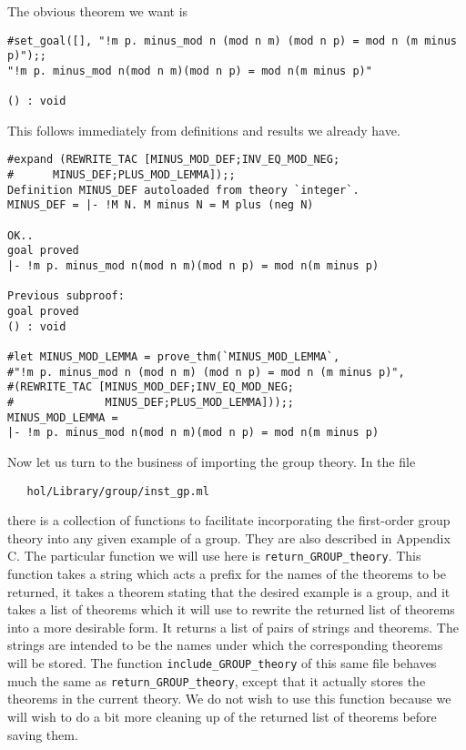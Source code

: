 The obvious theorem we want is
\begin{session}
\begin{verbatim}
#set_goal([], "!m p. minus_mod n (mod n m) (mod n p) = mod n (m minus p)");;
"!m p. minus_mod n(mod n m)(mod n p) = mod n(m minus p)"

() : void
\end{verbatim}
\end{session}
This follows immediately from definitions and results we already have.
\begin{session}
\begin{verbatim}
#expand (REWRITE_TAC [MINUS_MOD_DEF;INV_EQ_MOD_NEG;
#	   MINUS_DEF;PLUS_MOD_LEMMA]);;
Definition MINUS_DEF autoloaded from theory `integer`.
MINUS_DEF = |- !M N. M minus N = M plus (neg N)

OK..
goal proved
|- !m p. minus_mod n(mod n m)(mod n p) = mod n(m minus p)

Previous subproof:
goal proved
() : void

#let MINUS_MOD_LEMMA = prove_thm(`MINUS_MOD_LEMMA`,
#"!m p. minus_mod n (mod n m) (mod n p) = mod n (m minus p)",
#(REWRITE_TAC [MINUS_MOD_DEF;INV_EQ_MOD_NEG;
#              MINUS_DEF;PLUS_MOD_LEMMA]));;
MINUS_MOD_LEMMA = 
|- !m p. minus_mod n(mod n m)(mod n p) = mod n(m minus p)
\end{verbatim}
\end{session}

Now let us turn to the business of importing the group theory.  In the
file
\begin{verbatim}
   hol/Library/group/inst_gp.ml
\end{verbatim}
there is a collection of functions to facilitate incorporating the
first-order group theory into any given example of a group.  They are
also described in Appendix C.  The particular function we will use
here is {\small\verb+return_GROUP_theory+}.  This function takes a
string which acts a prefix for the names of the theorems to be
returned, it takes a theorem stating that the desired example is a
group, and it takes a list of theorems which it will use to rewrite
the returned list of theorems into a more desirable form.  It returns
a list of pairs of strings and theorems.  The strings are intended to
be the names under which the corresponding theorems will be stored.
The function {\small\verb+include_GROUP_theory+} of this same file
behaves much the same as {\small\verb+return_GROUP_theory+}, except
that it actually stores the theorems in the current theory.  We do not 
wish to use this function because we will wish to do a bit more
cleaning up of the returned list of theorems before saving them.

